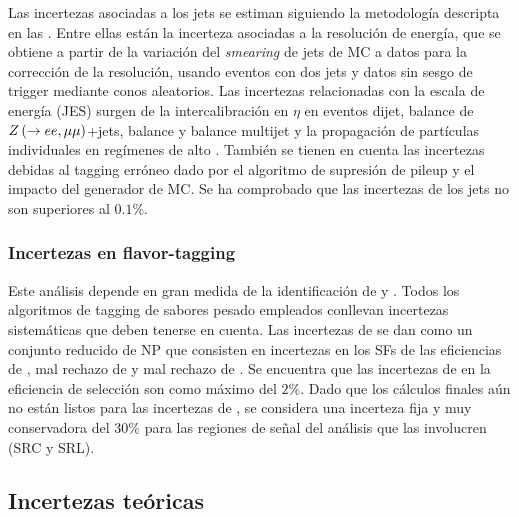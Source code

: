 Las incertezas asociadas a los jets se estiman siguiendo la metodología descripta en las .%
Entre ellas están la incerteza asociadas a la resolución de energía, que se obtiene a partir de la variación del \textit{smearing} de jets de \ac{MC} a datos para la corrección de la resolución, usando eventos con dos jets y datos sin sesgo de trigger mediante conos aleatorios.
Las incertezas relacionadas con la escala de energía (JES) surgen de la intercalibración en \(\eta\) en eventos dijet, balance de \(Z\left(\rightarrow ee, \mu\mu\right)\)+jets, balance \gammajet y balance multijet y la propagación de partículas individuales en regímenes de alto \pt.
También se tienen en cuenta las incertezas debidas al tagging erróneo dado por el algoritmo de supresión de pileup y el impacto del generador de \ac{MC}.
Se ha comprobado que las incertezas de los jets no son superiores al \(0.1\%\).









\subsubsection{Incertezas en flavor-tagging}

Este análisis depende en gran medida de la identificación de \bjets y \cjets. Todos los algoritmos de tagging de sabores pesado empleados conllevan incertezas sistemáticas que deben tenerse en cuenta. Las incertezas de \btagging se dan como un conjunto reducido de \ac{NP} que consisten en incertezas en los \acp{SF} de las eficiencias de \btagging, mal rechazo de \cjet y mal rechazo de \ljet. Se encuentra que las incertezas de \btagging en la eficiencia de selección son como máximo del \(2\%\). Dado que los cálculos finales aún no están listos para las incertezas de \ctagging, se considera una incerteza fija y muy conservadora del \(30\%\) para las regiones de señal del análisis que las involucren (SRC y SRL).








\subsection{Incertezas teóricas}
\label{subsec:signals:systs:theo}

